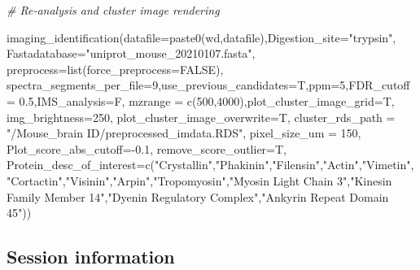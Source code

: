 \documentclass[
]{article}
\newenvironment{Shaded}{\begin{snugshade}}{\end{snugshade}}
\newcommand{\AttributeTok}[1]{\textcolor[rgb]{0.77,0.63,0.00}{#1}}
\newcommand{\CommentTok}[1]{\textcolor[rgb]{0.56,0.35,0.01}{\textit{#1}}}
\newcommand{\ConstantTok}[1]{\textcolor[rgb]{0.00,0.00,0.00}{#1}}
\newcommand{\DecValTok}[1]{\textcolor[rgb]{0.00,0.00,0.81}{#1}}
\newcommand{\FloatTok}[1]{\textcolor[rgb]{0.00,0.00,0.81}{#1}}
\newcommand{\FunctionTok}[1]{\textcolor[rgb]{0.00,0.00,0.00}{#1}}
\newcommand{\NormalTok}[1]{#1}
\newcommand{\SpecialCharTok}[1]{\textcolor[rgb]{0.00,0.00,0.00}{#1}}
\newcommand{\StringTok}[1]{\textcolor[rgb]{0.31,0.60,0.02}{#1}}
\begin{document}
\begin{Shaded}
\begin{Highlighting}[]
\CommentTok{\# Re{-}analysis and cluster image rendering}

\FunctionTok{imaging\_identification}\NormalTok{(}\AttributeTok{datafile=}\FunctionTok{paste0}\NormalTok{(wd,datafile),}\AttributeTok{Digestion\_site=}\StringTok{"trypsin"}\NormalTok{,}
                       \AttributeTok{Fastadatabase=}\StringTok{"uniprot\_mouse\_20210107.fasta"}\NormalTok{,}
                       \AttributeTok{preprocess=}\FunctionTok{list}\NormalTok{(}\AttributeTok{force\_preprocess=}\ConstantTok{FALSE}\NormalTok{),}
                       \AttributeTok{spectra\_segments\_per\_file=}\DecValTok{9}\NormalTok{,}\AttributeTok{use\_previous\_candidates=}\NormalTok{T,}\AttributeTok{ppm=}\DecValTok{5}\NormalTok{,}\AttributeTok{FDR\_cutoff =} \FloatTok{0.5}\NormalTok{,}\AttributeTok{IMS\_analysis=}\NormalTok{F,}
                       \AttributeTok{mzrange =} \FunctionTok{c}\NormalTok{(}\DecValTok{500}\NormalTok{,}\DecValTok{4000}\NormalTok{),}\AttributeTok{plot\_cluster\_image\_grid=}\NormalTok{T,}
                       \AttributeTok{img\_brightness=}\DecValTok{250}\NormalTok{, }\AttributeTok{plot\_cluster\_image\_overwrite=}\NormalTok{T,}
                       \AttributeTok{cluster\_rds\_path =} \StringTok{"/Mouse\_brain ID/preprocessed\_imdata.RDS"}\NormalTok{,}
                       \AttributeTok{pixel\_size\_um =} \DecValTok{150}\NormalTok{,}
                       \AttributeTok{Plot\_score\_abs\_cutoff=}\SpecialCharTok{{-}}\FloatTok{0.1}\NormalTok{,}
                       \AttributeTok{remove\_score\_outlier=}\NormalTok{T,}
                       \AttributeTok{Protein\_desc\_of\_interest=}\FunctionTok{c}\NormalTok{(}\StringTok{"Crystallin"}\NormalTok{,}\StringTok{"Phakinin"}\NormalTok{,}\StringTok{"Filensin"}\NormalTok{,}\StringTok{"Actin"}\NormalTok{,}\StringTok{"Vimetin"}\NormalTok{,}\StringTok{"Cortactin"}\NormalTok{,}\StringTok{"Visinin"}\NormalTok{,}\StringTok{"Arpin"}\NormalTok{,}\StringTok{"Tropomyosin"}\NormalTok{,}\StringTok{"Myosin Light Chain 3"}\NormalTok{,}\StringTok{"Kinesin Family Member 14"}\NormalTok{,}\StringTok{"Dyenin Regulatory Complex"}\NormalTok{,}\StringTok{"Ankyrin Repeat Domain 45"}\NormalTok{))}
\end{Highlighting}
\end{Shaded}

\hypertarget{session-information}{%
\subsection{Session information}\label{session-information}}
\end{document}
